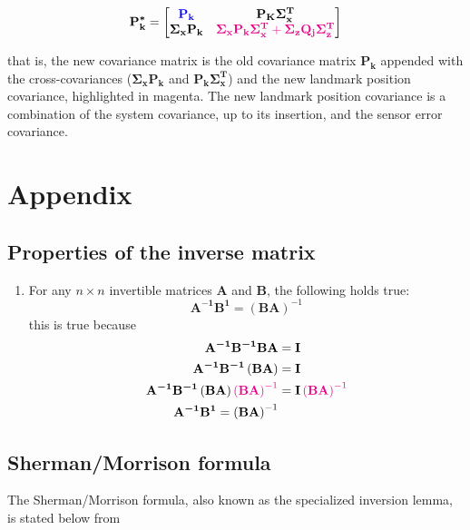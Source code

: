 \documentclass[12pt]{article}
\newcommand{\mat}[1]{\boldsymbol{\mathbf{#1}}}
\newcommand{\parentheses}[1]{\left(#1\right)}
\newcommand{\blue}[1]{\color{blue}#1\color{black}}
\newcommand{\magenta}[1]{\color{magenta}#1\color{black}}
\begin{document}
\begin{equation}
    \mat{P_k^*} = \begin{bmatrix}
       \blue{\mat{P_k}} & \mat{P_K \Sigma_x^T}\\
       \mat{\Sigma_x P_k} & \magenta{\mat{\Sigma_x P_k \Sigma_x^T} 
       + \mat{\Sigma_z Q_j \Sigma_z^T}}
    \end{bmatrix}
\end{equation}

that is, the new covariance matrix is the old covariance matrix $\mat{P_k}$ 
appended with the cross-covariances ($\mat{\Sigma_x P_k}$ and $\mat{P_k 
\Sigma_x^T}$) and the new landmark position covariance, highlighted in magenta. 
The new landmark position covariance is a combination of the system covariance, 
up to its insertion, and the sensor error covariance.

\section{Appendix}
\subsection{Properties of the inverse matrix}
\begin{enumerate}
    \item For any $n\times n$ invertible matrices $\mat{A}$ and $\mat{B}$, the 
    following holds true:
    \begin{equation}
        \mat{A^{-1}} \mat{B^{1}} = \left(\mat{B A}\right)^{-1}
    \end{equation}
    this is true because
    \begin{equation*}
    \begin{aligned}
        \mat{A^{-1}}\mat{B^{-1}}\mat{B A} &= \mat{I}\\
        \mat{A^{-1}}\mat{B^{-1}}\parentheses{\mat{B A}} &= \mat{I}\\
        \mat{A^{-1}}\mat{B^{-1}}\parentheses{\mat{B A}}\magenta{\parentheses{\mat{B A}}^{-1}} &= \mat{I}\magenta{\parentheses{\mat{B A}}^{-1}} \\
        \mat{A^{-1}} \mat{B^{1}} = \left(\mat{B A}\right)^{-1}
    \end{aligned}
    \end{equation*}
\end{enumerate}



\subsection{Sherman/Morrison formula}
The Sherman/Morrison formula, also known as the specialized inversion lemma, is stated below from \cite[p.~50]{bongard2006probabilistic}
\end{document}
